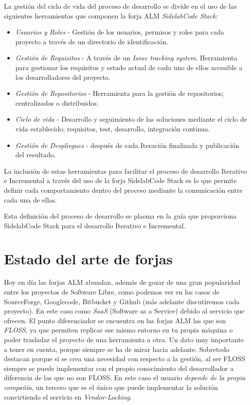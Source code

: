 \par La gestión del ciclo de vida del proceso de desarrollo se divide en el uso de las siguientes herramientas que componen la forja ALM \emph{SidelabCode Stack}:

\begin{itemize}
    \item \emph{Usuarios y Roles} - Gestión de los usuarios, permisos y roles para cada proyecto a través de un directorio de identificación.
	\item \emph{Gesti\'on de Requisitos} - A través de un \emph{Issue tracking system}. Herramienta para gestionar los requisitos y estado actual de cada uno de ellos accesible a los desarrolladores del proyecto.
	\item \emph{Gestión de Repositorios} - Herramienta para la gestión de repositorios; centralizados o distribuidos.
	\item \emph{Ciclo de vida} - Desarrollo y seguimiento de las soluciones mediante el ciclo de vida establecido; requisitos, test, desarrollo, integración continua.
	\item \emph{Gestión de Despliegues} - después de cada Iteración finalizada y publicación del resultado.
\end{itemize}

\par La inclusión de estas herramientas para facilitar el proceso de desarrollo Iterativo e Incremental a través del uso de la forja SidelabCode Stack es lo que permite definir cada comportamiento dentro del proceso mediante la comunicación entre cada una de ellas.

\par Esta definición del proceso de desarrollo se plasma en la guía que proporciona SidelabCode Stack para el desarrollo Iterativo e Incremental.


\section{Estado del arte de forjas}
\label{sec:estado-del-arte}

\par Hoy en d\'ia las forjas ALM abundan, adem\'as de gozar de una gran popularidad entre los proyectos de Software Libre, como podemos ver en los casos de SourceForge, Googlecode, Bitbucket y Github (más adelante discutiremos cada proyecto). En este caso como \emph{SaaS} (Software as a Service) debido al servicio que ofrecen. El punto diferenciador se encuentra en las forjas ALM las que son \emph{FLOSS}, ya que permiten replicar ese mismo entorno en tu propia máquina o poder trasladar el proyecto de una herramienta a otra. Un dato muy importante a tener en cuenta, porque siempre se ha de mirar hacia adelante. Sobretodo destacan porque si se crea una necesidad con respecto a la gestión, al ser FLOSS siempre se puede implementar con el propio conocimiento del desarrollador a diferencia de las que no son FLOSS. En este caso el usuario \emph{depende de la propia compañía}, un tercero que es el único que puede implementar la solución convirtiendo el servicio en \emph{Vendor-Locking}.

